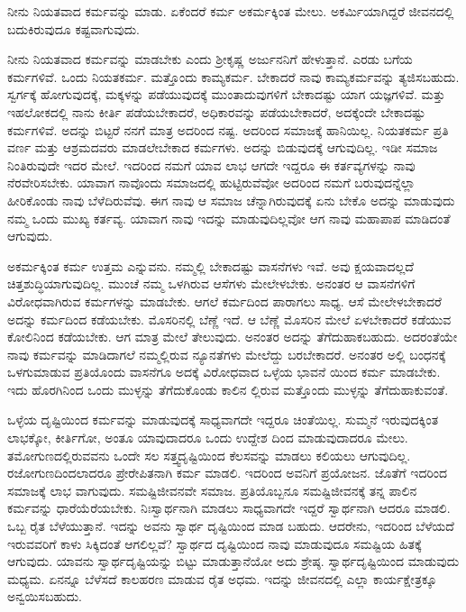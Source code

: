 {\small ನೀನು ನಿಯತವಾದ ಕರ್ಮವನ್ನು ಮಾಡು. ಏಕೆಂದರೆ ಕರ್ಮ ಅಕರ್ಮಕ್ಕಿಂತ ಮೇಲು. ಅಕರ್ಮಿಯಾಗಿದ್ದರೆ ಜೀವನದಲ್ಲಿ ಬದುಕಿರುವುದೂ ಕಷ್ಟವಾಗುವುದು.}

ನೀನು ನಿಯತವಾದ ಕರ್ಮವನ್ನು ಮಾಡಬೇಕು ಎಂದು ಶ‍್ರೀಕೃಷ್ಣ ಅರ್ಜುನನಿಗೆ ಹೇಳುತ್ತಾನೆ. ಎರಡು ಬಗೆಯ ಕರ್ಮಗಳಿವೆ. ಒಂದು ನಿಯತಕರ್ಮ. ಮತ್ತೊಂದು ಕಾಮ್ಯಕರ್ಮ. ಬೇಕಾದರೆ ನಾವು ಕಾಮ್ಯಕರ್ಮವನ್ನು ತ್ಯಜಿಸಬಹುದು. ಸ್ವರ್ಗಕ್ಕೆ ಹೋಗುವುದಕ್ಕೆ, ಮಕ್ಕಳನ್ನು ಪಡೆಯುವುದಕ್ಕೆ ಮುಂತಾದುವುಗಳಿಗೆ ಬೇಕಾದಷ್ಟು ಯಾಗ ಯಜ್ಞಗಳಿವೆ. ಮತ್ತು ಇಹಲೋಕದಲ್ಲಿ ನಾನು ಕೀರ್ತಿ ಪಡೆಯಬೇಕಾದರೆ, ಅಧಿಕಾರವನ್ನು ಪಡೆಯಬೇಕಾದರೆ, ಅದಕ್ಕೆಂದೇ ಬೇಕಾದಷ್ಟು ಕರ್ಮಗಳಿವೆ. ಅದನ್ನು ಬಿಟ್ಟರೆ ನನಗೆ ಮಾತ್ರ ಅದರಿಂದ ನಷ್ಟ. ಅದರಿಂದ ಸಮಾಜಕ್ಕೆ ಹಾನಿಯಿಲ್ಲ. ನಿಯತಕರ್ಮ ಪ್ರತಿ ವರ್ಣ ಮತ್ತು ಆಶ್ರಮದವರು ಮಾಡಲೇಬೇಕಾದ ಕರ್ಮಗಳು. ಅದನ್ನು ಬಿಡುವುದಕ್ಕೆ ಆಗುವುದಿಲ್ಲ. ಇಡೀ ಸಮಾಜ ನಿಂತಿರುವುದೇ ಇದರ ಮೇಲೆ. ಇದರಿಂದ ನಮಗೆ ಯಾವ ಲಾಭ ಆಗದೇ ಇದ್ದರೂ ಈ ಕರ್ತವ್ಯಗಳನ್ನು ನಾವು ನೆರವೇರಿಸಬೇಕು. ಯಾವಾಗ ನಾವೊಂದು ಸಮಾಜದಲ್ಲಿ ಹುಟ್ಟಿರುವೆವೋ ಅದರಿಂದ ನಮಗೆ ಬರುವುದನ್ನೆಲ್ಲಾ ಹೀರಿಕೊಂಡು ನಾವು ಬೆಳೆದಿರುವೆವು. ಈಗ ನಾವು ಆ ಸಮಾಜ ಚೆನ್ನಾಗಿರುವುದಕ್ಕೆ ಏನು ಬೇಕೊ ಅದನ್ನು ಮಾಡುವುದು ನಮ್ಮ ಒಂದು ಮುಖ್ಯ ಕರ್ತವ್ಯ. ಯಾವಾಗ ನಾವು ಇದನ್ನು ಮಾಡುವುದಿಲ್ಲವೋ ಆಗ ನಾವು ಮಹಾಪಾಪ ಮಾಡಿದಂತೆ ಆಗುವುದು.

ಅಕರ್ಮಕ್ಕಿಂತ ಕರ್ಮ ಉತ್ತಮ ಎನ್ನುವನು. ನಮ್ಮಲ್ಲಿ ಬೇಕಾದಷ್ಟು ವಾಸನೆಗಳು ಇವೆ. ಅವು ಕ್ಷಯವಾದಲ್ಲದೆ ಚಿತ್ತಶುದ್ಧಿಯಾಗುವುದಿಲ್ಲ. ಮುಂಚೆ ನಮ್ಮ ಒಳಗಿರುವ ಆಸೆಗಳು ಮೇಲೇಳಬೇಕು. ಅನಂತರ ಆ ವಾಸನೆಗಳಿಗೆ ವಿರೋಧವಾಗಿರುವ ಕರ್ಮಗಳನ್ನು ಮಾಡಬೇಕು. ಆಗಲೆ ಕರ್ಮದಿಂದ ಪಾರಾಗಲು ಸಾಧ್ಯ. ಆಸೆ ಮೇಲೇಳಬೇಕಾದರೆ ಅದನ್ನು ಕರ್ಮದಿಂದ ಕಡೆಯಬೇಕು. ಮೊಸರಿನಲ್ಲಿ ಬೆಣ್ಣೆ ಇದೆ. ಆ ಬೆಣ್ಣೆ ಮೊಸರಿನ ಮೇಲೆ ಏಳಬೇಕಾದರೆ ಕಡೆಯುವ ಕೋಲಿನಿಂದ ಕಡೆಯಬೇಕು. ಆಗ ಮಾತ್ರ ಮೇಲೆ ತೇಲುವುದು. ಅನಂತರ ಅದನ್ನು ತೆಗೆದುಹಾಕಬಹುದು. ಅದರಂತೆಯೇ ನಾವು ಕರ್ಮವನ್ನು ಮಾಡಿದಾಗಲೆ ನಮ್ಮಲ್ಲಿರುವ ನ್ಯೂನತೆಗಳು ಮೇಲೆದ್ದು ಬರಬೇಕಾದರೆ. ಅನಂತರ ಅಲ್ಲಿ ಬಂಧನಕ್ಕೆ ಒಳಗುಮಾಡುವ ಪ್ರತಿಯೊಂದು ವಾಸನೆಗೂ ಅದಕ್ಕೆ ವಿರೋಧವಾದ ಒಳ್ಳೆಯ ಭಾವನೆ ಯಿಂದ ಕರ್ಮ ಮಾಡಬೇಕು. ಇದು ಹೊರಗಿನಿಂದ ಒಂದು ಮುಳ್ಳನ್ನು ತೆಗೆದುಕೊಂಡು ಕಾಲಿನ ಲ್ಲಿರುವ ಮತ್ತೊಂದು ಮುಳ್ಳನ್ನು ತೆಗೆದುಹಾಕುವಂತೆ.

ಒಳ್ಳೆಯ ದೃಷ್ಟಿಯಿಂದ ಕರ್ಮವನ್ನು ಮಾಡುವುದಕ್ಕೆ ಸಾಧ್ಯವಾಗದೇ ಇದ್ದರೂ ಚಿಂತೆಯಿಲ್ಲ. ಸುಮ್ಮನೆ ಇರುವುದಕ್ಕಿಂತ ಲಾಭಕ್ಕೋ, ಕೀರ್ತಿಗೋ, ಅಂತೂ ಯಾವುದಾದರೂ ಒಂದು ಉದ್ದೇಶ ದಿಂದ ಮಾಡುವುದಾದರೂ ಮೇಲು. ತಮೋಗುಣದಲ್ಲಿರುವವನು ಒಂದೇ ಸಲ ಸತ್ತ್ವದೃಷ್ಟಿಯಿಂದ ಕೆಲಸವನ್ನು ಮಾಡಲು ಕಲಿಯಲು ಆಗುವುದಿಲ್ಲ. ರಜೋಗುಣದಿಂದಲಾದರೂ ಪ್ರೇರೇಪಿತನಾಗಿ ಕರ್ಮ ಮಾಡಲಿ. ಇದರಿಂದ ಅವನಿಗೆ ಪ್ರಯೋಜನ. ಜೊತೆಗೆ ಇದರಿಂದ ಸಮಾಜಕ್ಕೆ ಲಾಭ ವಾಗುವುದು. ಸಮಷ್ಟಿಜೀವನವೇ ಸಮಾಜ. ಪ್ರತಿಯೊಬ್ಬನೂ ಸಮಷ್ಟಿಜೀವನಕ್ಕೆ ತನ್ನ ಪಾಲಿನ ಕರ್ಮವನ್ನು ಧಾರೆಯೆರೆಯಬೇಕು. ನಿಃಸ್ವಾರ್ಥನಾಗಿ ಮಾಡಲು ಸಾಧ್ಯವಾಗದೇ ಇದ್ದರೆ ಸ್ವಾರ್ಥನಾಗಿ ಆದರೂ ಮಾಡಲಿ. ಒಬ್ಬ ರೈತ ಬೆಳೆಯುತ್ತಾನೆ. ಇದನ್ನು ಅವನು ಸ್ವಾರ್ಥ ದೃಷ್ಟಿಯಿಂದ ಮಾಡ ಬಹುದು. ಆದರೇನು, ಇದರಿಂದ ಬೆಳೆಯದೆ ಇರುವವರಿಗೆ ಕಾಳು ಸಿಕ್ಕಿದಂತೆ ಆಗಲಿಲ್ಲವೆ? ಸ್ವಾರ್ಥದ ದೃಷ್ಟಿಯಿಂದ ನಾವು ಮಾಡುವುದೂ ಸಮಷ್ಟಿಯ ಹಿತಕ್ಕೆ ಆಗುವುದು. ಯಾವನು ಸ್ವಾರ್ಥದೃಷ್ಟಿಯನ್ನು ಬಿಟ್ಟು ಮಾಡುತ್ತಾನೆಯೋ ಅದು ಶ್ರೇಷ್ಠ. ಸ್ವಾರ್ಥದೃಷ್ಟಿಯಿಂದ ಮಾಡುವುದು ಮಧ್ಯಮ. ಏನನ್ನೂ ಬೆಳೆಸದೆ ಕಾಲಹರಣ ಮಾಡುವ ರೈತ ಅಧಮ. ಇದನ್ನು ಜೀವನದಲ್ಲಿ ಎಲ್ಲಾ ಕಾರ್ಯಕ್ಷೇತ್ರಕ್ಕೂ ಅನ್ವಯಿಸಬಹುದು.

